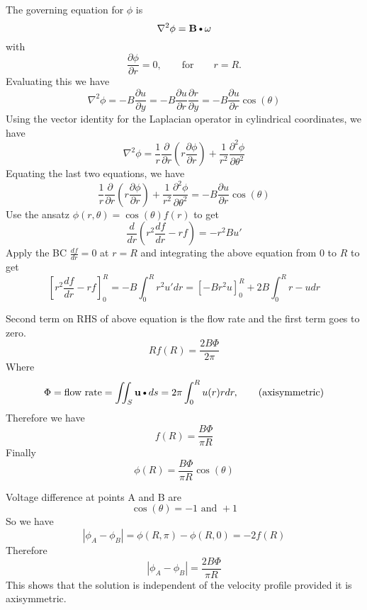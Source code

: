 \documentclass[11pt]{article}
\newcommand{\DOT}{\text{\textbullet}}
\newcommand{\B}{\mathbf{B}}
\newcommand{\U}{\mathbf{u}}
\newcommand{\PD}{\partial}
\begin{document}
The governing equation for $\phi$ is
\begin{equation}
	\nabla^2 \phi = \B \DOT \omega
\end{equation}
with
\begin{equation}
	\frac{\PD \phi}{\PD r} = 0, \qquad \text{for} \qquad r=R.
\end{equation}
Evaluating this we have
\begin{equation}
	\nabla^2\phi 
	= -B \frac{\PD u}{\PD y}
	= -B \frac{\PD u}{\PD r} \frac{\PD r}{\PD y}
	= -B \frac{\PD u}{\PD r} \cos(\theta)
\end{equation}
Using the vector identity for the Laplacian operator in cylindrical coordinates, we have
\begin{equation}
	\nabla^2 \phi = 
	\frac{1}{r} \frac{\PD}{\PD r} \left( r \frac{\PD \phi}{\PD r} \right)
	+ \frac{1}{r^2} \frac{\PD^2 \phi}{\PD \theta^2}
\end{equation}
Equating the last two equations, we have
\begin{equation}
	\frac{1}{r} \frac{\PD}{\PD r} \left( r \frac{\PD \phi}{\PD r} \right)
	+ \frac{1}{r^2} \frac{\PD^2 \phi}{\PD \theta^2}
	=
	-B \frac{\PD u}{\PD r} \cos(\theta)
\end{equation}
Use the ansatz $\phi(r,\theta) = \cos(\theta) f(r)$ to get
\begin{equation}
	\frac{d}{dr} \left( r^2 \frac{df}{dr} - rf \right)
	=
	-r^2 Bu'
\end{equation}
Apply the BC $\frac{df}{dr}=0$ at $r=R$ and integrating the above equation from 0 to $R$ to get
\begin{equation}
	\left[ r^2 \frac{df}{dr} - rf \right]_0^R
	=
	-B \int_0^R r^2 u' dr
	= \left[ -Br^2 u \right]_0^R + 2B \int_0^R r-u dr
\end{equation}

Second term on RHS of above equation is the flow rate and the first term goes to zero.
\begin{equation}
	R f(R) = \frac{2B \Phi}{2 \pi}
\end{equation}
Where
\begin{equation}
	\Phi = \text{flow rate} = \iint_S \U \DOT ds
	= 2\pi \int_0^R u(r) r dr
	, \qquad \text{(axisymmetric)}
\end{equation}
Therefore we have
\begin{equation}
	\boxed{
	f(R) = \frac{B\Phi}{\pi R}
	}
\end{equation}
Finally
\begin{equation}
	\boxed{
	\phi(R) = \frac{B\Phi}{\pi R} \cos(\theta)
	}
\end{equation}

Voltage difference at points A and B are
\begin{equation}
	\cos(\theta) = -1 \text{ and } +1
\end{equation}
So we have
\begin{equation}
	|\phi_A - \phi_B| 
	= \phi(R,\pi) - \phi(R,0)
	=-2f(R)
\end{equation}
Therefore
\begin{equation}
	\boxed{|\phi_A - \phi_B | = \frac{2B\Phi}{\pi R}}
\end{equation}
This shows that the solution is independent of the velocity profile provided it is axisymmetric.
\end{document}

